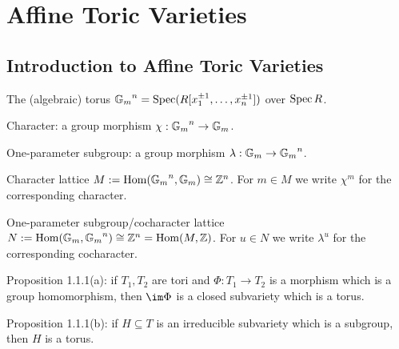 \section{Affine Toric Varieties}

\subsection{Introduction to Affine Toric Varieties}

\begin{definition}
  \label{torusOver}
  \leanok
  The (algebraic) torus \({\mathbb G_m}^n = \operatorname{Spec}(R[x_1^{\pm 1}, \dotsc, x_n^{\pm 1}])\) over \(\operatorname{Spec} R\).
\end{definition}

\begin{definition}
  \label{char}
  Character: a group morphism \(\chi : {\mathbb G_m}^n \to {\mathbb G_m}\).
\end{definition}

\begin{definition}
  \label{one_ps}
  One-parameter subgroup: a group morphism \(\lambda : {\mathbb G_m} \to {\mathbb G_m}^n\).
\end{definition}

\begin{definition}
  \label{char_lattice}
  Character lattice \(M := \operatorname{Hom}({\mathbb G_m}^n, {\mathbb G_m}) \cong {\mathbb Z}^n\). For \(m \in M\) we write \(\chi^m\) for the corresponding character.
\end{definition}

\begin{definition}
  \label{ops_lattice}
  One-parameter subgroup/cocharacter lattice \(N := \operatorname{Hom}({\mathbb G_m}, {\mathbb G_m}^n) \cong {\mathbb Z}^n = \operatorname{Hom}(M, {\mathbb Z})\). For \(u \in N\) we write \(\lambda^u\) for the corresponding cocharacter.
\end{definition}

\begin{proposition}
  \label{prop:1.1.1.a}
  Proposition 1.1.1(a): if \(T_1, T_2\) are tori and \(\Phi : T_1 \to T_2\) is a morphism which is a group homomorphism, then \(\im \Phi\) is a closed subvariety which is a torus.
\end{proposition}

\begin{proposition}
  \label{prop:1.1.1.b}
  Proposition 1.1.1(b): if \(H \subseteq T\) is an irreducible subvariety which is a subgroup, then \(H\) is a torus.
\end{proposition}

